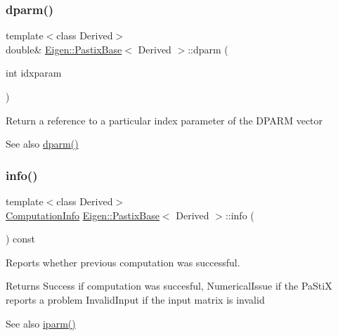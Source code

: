 \subsubsection{\texorpdfstring{dparm()}{dparm()}\hspace{0.1cm}{\footnotesize\ttfamily [2/2]}}
{\footnotesize\ttfamily template$<$class Derived$>$ \\
double\& \mbox{\hyperlink{class_eigen_1_1_pastix_base}{Eigen\+::\+Pastix\+Base}}$<$ Derived $>$\+::dparm (\begin{DoxyParamCaption}\item[{int}]{idxparam }\end{DoxyParamCaption})\hspace{0.3cm}{\ttfamily [inline]}}

Return a reference to a particular index parameter of the D\+P\+A\+RM vector \begin{DoxySeeAlso}{See also}
\mbox{\hyperlink{class_eigen_1_1_pastix_base_af4a29373aa3e6a980738efde33f92a76}{dparm()}} 
\end{DoxySeeAlso}
\mbox{\label{class_eigen_1_1_pastix_base_a436e99a385c9c019be9627cc1fa884cf}} 
\subsubsection{\texorpdfstring{info()}{info()}}
{\footnotesize\ttfamily template$<$class Derived$>$ \\
\mbox{\hyperlink{group__enums_ga85fad7b87587764e5cf6b513a9e0ee5e}{Computation\+Info}} \mbox{\hyperlink{class_eigen_1_1_pastix_base}{Eigen\+::\+Pastix\+Base}}$<$ Derived $>$\+::info (\begin{DoxyParamCaption}{ }\end{DoxyParamCaption}) const\hspace{0.3cm}{\ttfamily [inline]}}



Reports whether previous computation was successful. 

\begin{DoxyReturn}{Returns}
{\ttfamily Success} if computation was succesful, {\ttfamily Numerical\+Issue} if the Pa\+StiX reports a problem {\ttfamily Invalid\+Input} if the input matrix is invalid
\end{DoxyReturn}
\begin{DoxySeeAlso}{See also}
\mbox{\hyperlink{class_eigen_1_1_pastix_base_a38378e7b2b5c750a8a23e2c21a69146c}{iparm()}} 
\end{DoxySeeAlso}
\mbox{\label{class_eigen_1_1_pastix_base_ac6202714edd1943646e34f16ad384336}} 
